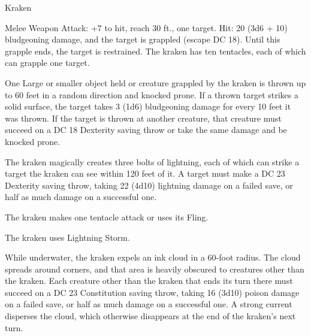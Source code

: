 \begin{monsterbox}{Kraken}
\begin{monsteraction}[Bite]
\end{monsteraction}
\begin{monsteraction}[Tentacle]
Melee Weapon Attack: +7 to hit, reach 30 ft., one target. Hit: 20 (3d6 + 10) bludgeoning damage, and the target is grappled (escape DC 18). Until this grapple ends, the target is restrained. The kraken has ten tentacles, each of which can grapple one target.
\end{monsteraction}
\begin{monsteraction}[Fling]
One Large or smaller object held or creature grappled by the kraken is thrown up to 60 feet in a random direction and knocked prone. If a thrown target strikes a solid surface, the target takes 3 (1d6) bludgeoning damage for every 10 feet it was thrown. If the target is thrown at another creature, that creature must succeed on a DC 18 Dexterity saving throw or take the same damage and be knocked prone.
\end{monsteraction}
\begin{monsteraction}
The kraken magically creates three bolts of lightning, each of which can strike a target the kraken can see within 120 feet of it. A target must make a DC 23 Dexterity saving throw, taking 22 (4d10) lightning damage on a failed save, or half as much damage on a successful one.
\end{monsteraction}
\begin{monsteraction}
The kraken makes one tentacle attack or uses its Fling.
\end{monsteraction}
\begin{monsteraction}
The kraken uses Lightning Storm.
\end{monsteraction}
\begin{monsteraction}
While underwater, the kraken expels an ink cloud in a 60-foot radius. The cloud spreads around corners, and that area is heavily obscured to creatures other than the kraken. Each creature other than the kraken that ends its turn there must succeed on a DC 23 Constitution saving throw, taking 16 (3d10) poison damage on a failed save, or half as much damage on a successful one. A strong current disperses the cloud, which otherwise disappears at the end of the kraken's next turn.
\end{monsteraction}
\end{monsterbox}